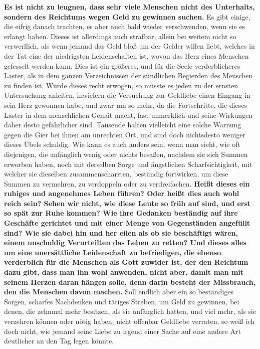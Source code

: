 \textbf{Es ist nicht zu leugnen, dass sehr viele Menschen nicht des Unterhalts,
sondern
des Reichtums wegen Geld zu gewinnen suchen.} Es gibt einige, die eifrig
danach trachten, es aber auch bald wieder verschwenden,
wenn sie es erlangt
haben. Dieses ist allerdings auch strafbar, allein bei weitem nicht so
verwerflich, als wenn jemand das Geld bloß um der Gelder willen liebt, welches
in der Tat eine der niedrigsten Leidenschaften
ist, wovon das Herz eines
Menschen gefesselt werden kann. Dies ist ein größeres, und für die Seele
verderblicheres Laster, als in dem ganzen Verzeichnissen der sündlichen
Begierden des Menschen zu finden ist. Würde dieses recht erwogen, so müsste es
jeden zu der ernsten Untersuchung anleiten, inwiefern die Versuchung zur
Geldliebe einen Eingang in sein Herz gewonnen habe, und zwar um so mehr, da die
Fortschritte, die dieses Laster in dem menschlichen Gemüt macht, fast
unmerklich und seine Wirkungen daher desto gefährlicher sind. Tausende halten
vielleicht eine solche Warnung gegen die Gier bei ihnen am unrechten Ort, und
sind doch nichtsdesto weniger dieses Übels schuldig. Wie kann es auch anders
sein, wenn man sieht, wie oft diejenigen, die anfänglich wenig oder nichts
besaßen, nachdem sie sich Summen erworben haben, noch mit derselben Sorge und
ängstlichen Scharfsichtigkeit, mit welcher sie dieselben zusammenscharrten,
beständig fortwirken, um diese Summen zu vermehren, zu verdoppeln oder zu
verdreifachen. \textbf{Heißt dieses ein ruhiges und angenehmes Leben führen?
Oder heißt
dies auch wohl reich sein? Sehen wir nicht, wie diese Leute so früh auf sind,
und erst so spät zur Ruhe kommen? Wie ihre Gedanken beständig auf ihre Geschäfte
gerichtet und mit einer Menge von Gegenständen angefüllt sind? Wie sie dabei hin
und her eilen als ob sie beschäftigt wären, einem unschuldig Verurteilten das
Leben zu retten? Und dieses alles um eine unersättliche Leidenschaft zu
befriedigen, die ebenso verderblich für die Menschen als Gott zuwider ist, der
den Reichtum dazu gibt, dass man ihn wohl anwenden, nicht aber, damit man mit
seinem Herzen daran hängen solle, denn darin besteht der Missbrauch, den die
Menschen davon machen.} Soll endlich aber ein so beständiges Sorgen, scharfes
Nachdenken und tätiges Streben, um Geld zu gewinnen, bei denen, die zehnmal
mehr besitzen, als sie anfänglich hatten, und viel mehr, als sie verzehren
können oder nötig haben, nicht offenbar Geldliebe verraten, so weiß ich doch
nicht, wie jemand seine Liebe zu irgend einer Sache auf eine andere Art
deutlicher an den Tag legen könnte.

